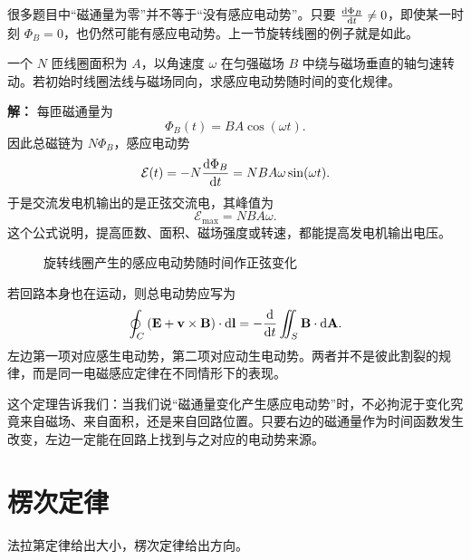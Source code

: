 \begin{remark}
很多题目中“磁通量为零”并不等于“没有感应电动势”。只要 $\dv{\Phi_B}{t}\neq 0$，即使某一时刻 $\Phi_B=0$，也仍然可能有感应电动势。上一节旋转线圈的例子就是如此。
\end{remark}

\begin{example}
一个 $N$ 匝线圈面积为 $A$，以角速度 $\omega$ 在匀强磁场 $B$ 中绕与磁场垂直的轴匀速转动。若初始时线圈法线与磁场同向，求感应电动势随时间的变化规律。

\textbf{解：} 每匝磁通量为
\[
\Phi_B(t)=BA\cos(\omega t).
\]
因此总磁链为 $N\Phi_B$，感应电动势
\[
\mathcal{E}(t)=-N\dv{\Phi_B}{t}=NBA\omega \sin(\omega t).
\]
于是交流发电机输出的是正弦交流电，其峰值为
\[
\mathcal{E}_{\max}=NBA\omega.
\]
这个公式说明，提高匝数、面积、磁场强度或转速，都能提高发电机输出电压。
\end{example}

\begin{figure}[htbp]
\centering
{}
\caption{旋转线圈产生的感应电动势随时间作正弦变化}
\end{figure}

\begin{theorem}[广义法拉第定律]
若回路本身也在运动，则总电动势应写为
\[
\oint_C \left(\vb{E}+\vb{v}\times\vb{B}\right)\cdot \dd \vb{l}
=-\dv{}{t}\iint_S \vb{B}\cdot \dd \vb{A}.
\]
左边第一项对应感生电动势，第二项对应动生电动势。两者并不是彼此割裂的规律，而是同一电磁感应定律在不同情形下的表现。
\end{theorem}

这个定理告诉我们：当我们说“磁通量变化产生感应电动势”时，不必拘泥于变化究竟来自磁场、来自面积，还是来自回路位置。只要右边的磁通量作为时间函数发生改变，左边一定能在回路上找到与之对应的电动势来源。

\section{楞次定律}

法拉第定律给出大小，楞次定律给出方向。

